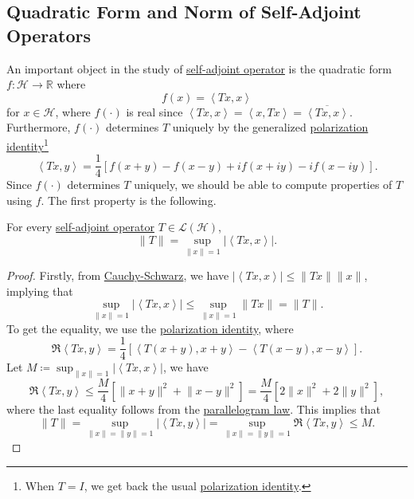 \subsection{Quadratic Form and Norm of Self-Adjoint Operators}
An important object in the study of \hyperref[def:self-adjoint-op]{self-adjoint operator} is the quadratic form \(f\colon \mathcal{H} \to \mathbb{R} \) where
\[
	f(x) = \left\langle Tx, x \right\rangle
\]
for \(x\in \mathcal{H} \), where \(f(\cdot)\) is real since \(\left\langle Tx, x \right\rangle = \left\langle x, Tx \right\rangle = \overline{\left\langle Tx, x \right\rangle }\). Furthermore, \(f(\cdot)\) determines \(T\) uniquely by the generalized \hyperref[lma:polarization-identity]{polarization identity}\footnote{When \(T = I\), we get back the usual \hyperref[lma:polarization-identity]{polarization identity}.}
\[
	\left\langle Tx, y \right\rangle = \frac{1}{4} \left[ f(x+ y) - f(x-y) + if(x+iy) - if(x-iy) \right].
\]
Since \(f(\cdot)\) determines \(T\) uniquely, we should be able to compute properties of \(T\) using \(f\). The first property is the following.
\begin{proposition}
	For every \hyperref[def:self-adjoint-op]{self-adjoint operator} \(T\in \mathcal{L} (\mathcal{H} )\),
	\[
		\lVert T \rVert = \sup _{\lVert x \rVert = 1} \vert \left\langle Tx, x \right\rangle \vert.
	\]
\end{proposition}
\begin{proof}
	Firstly, from \hyperref[thm:Cauchy-Schwarz-ineq]{Cauchy-Schwarz}, we have \(\vert \left\langle Tx, x \right\rangle \vert \leq \lVert Tx \rVert \lVert x \rVert \), implying that
	\[
		\sup _{\lVert x \rVert = 1} \vert \left\langle Tx, x \right\rangle  \vert \leq \sup _{\lVert x \rVert = 1} \lVert Tx \rVert = \lVert T \rVert .
	\]
	To get the equality, we use the \hyperref[lma:polarization-identity]{polarization identity}, where
	\[
		\Re \left\langle Tx, y \right\rangle
		= \frac{1}{4} \left[ \left\langle T(x+ y) , x+y\right\rangle - \left\langle T(x-y), x-y \right\rangle  \right].
	\]
	Let \(M\coloneqq \sup _{\lVert x \rVert = 1} \vert \left\langle Tx, x \right\rangle  \vert \), we have
	\[
		\Re\left\langle Tx, y \right\rangle
		\leq \frac{M}{4} \left[ \lVert x+y \rVert ^{2} + \lVert x-y \rVert ^{2}  \right]
		= \frac{M}{4} \left[ 2\lVert x \rVert ^{2} + 2 \lVert y \rVert ^{2} \right],
	\]
	where the last equality follows from the \hyperref[lma:parallelogram-law]{parallelogram law}. This implies that
	\[
		\lVert T \rVert
		= \sup _{\lVert x \rVert = \lVert y \rVert = 1} \vert \left\langle Tx, y \right\rangle \vert
		= \sup _{\lVert x \rVert = \lVert y \rVert = 1} \Re \left\langle Tx, y \right\rangle
		\leq M.
	\]
\end{proof}

